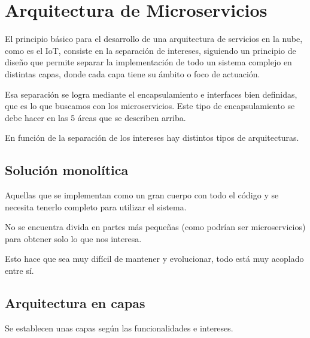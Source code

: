 \documentclass[12pt, twoside, openright]{report} %
\begin{document}
\section{Arquitectura de Microservicios}

El principio básico para el desarrollo de una arquitectura de servicios en la nube, como es el IoT, consiste en la separación de intereses, siguiendo un principio de diseño que permite separar la implementación de todo un sistema complejo en distintas capas, donde cada capa tiene su ámbito o foco de actuación.

Esa separación se logra mediante el encapsulamiento e interfaces bien definidas, que es lo que buscamos con los microservicios.
Este tipo de encapsulamiento se debe hacer en las 5 áreas que se describen arriba.

En función de la separación de los intereses hay distintos tipos de arquitecturas.

\subsection{Solución monolítica}
Aquellas que se implementan como un gran cuerpo con todo el código y se necesita tenerlo completo para utilizar el sistema.

No se encuentra divida en partes más pequeñas (como podrían ser microservicios) para obtener solo lo que nos interesa.

Esto hace que sea muy difícil de mantener y evolucionar, todo está muy acoplado entre sí.

\subsection{Arquitectura en capas}
Se establecen unas capas según las funcionalidades e intereses.
\end{document}
